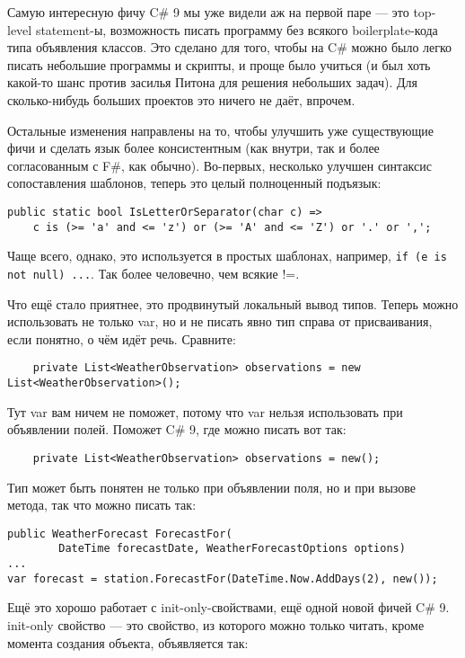 \documentclass[a5paper]{article}
\begin{document}
Самую интересную фичу C\# 9 мы уже видели аж на первой паре --- это top-level statement-ы, возможность писать программу без всякого boilerplate-кода типа объявления классов. Это сделано для того, чтобы на C\# можно было легко писать небольшие программы и скрипты, и проще было учиться (и был хоть какой-то шанс против засилья Питона для решения небольших задач). Для сколько-нибудь больших проектов это ничего не даёт, впрочем.

Остальные изменения направлены на то, чтобы улучшить уже существующие фичи и сделать язык более консистентным (как внутри, так и более согласованным с F\#, как обычно). Во-первых, несколько улучшен синтаксис сопоставления шаблонов, теперь это целый полноценный подъязык:

\begin{verbatim}
public static bool IsLetterOrSeparator(char c) =>
    c is (>= 'a' and <= 'z') or (>= 'A' and <= 'Z') or '.' or ',';
\end{verbatim}

Чаще всего, однако, это используется в простых шаблонах, например, \texttt{if (e is not null) ...}. Так более человечно, чем всякие !=.

Что ещё стало приятнее, это продвинутый локальный вывод типов. Теперь можно использовать не только var, но и не писать явно тип справа от присваивания, если понятно, о чём идёт речь. Сравните:

\begin{verbatim}
    private List<WeatherObservation> observations = new List<WeatherObservation>();
\end{verbatim}

Тут var вам ничем не поможет, потому что var нельзя использовать при объявлении полей. Поможет C\# 9, где можно писать вот так:

\begin{verbatim}
    private List<WeatherObservation> observations = new();
\end{verbatim}

Тип может быть понятен не только при объявлении поля, но и при вызове метода, так что можно писать так:

\begin{verbatim}
public WeatherForecast ForecastFor(
        DateTime forecastDate, WeatherForecastOptions options)
...
var forecast = station.ForecastFor(DateTime.Now.AddDays(2), new());
\end{verbatim}


Ещё это хорошо работает с init-only-свойствами, ещё одной новой фичей C\# 9. init-only свойство --- это свойство, из которого можно только читать, кроме момента создания объекта, объявляется так:
\end{document}
